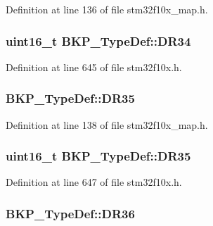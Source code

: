 Definition at line 136 of file stm32f10x\+\_\+map.\+h.

\subsubsection[{\texorpdfstring{D\+R34}{DR34}}]{ {\bf uint16\+\_\+t} B\+K\+P\+\_\+\+Type\+Def\+::\+D\+R34}\hypertarget{struct_b_k_p___type_def_a0e6152e3a9ac3f0086df42cebb80832f}{}\label{struct_b_k_p___type_def_a0e6152e3a9ac3f0086df42cebb80832f}


Definition at line 645 of file stm32f10x.\+h.

\subsubsection[{\texorpdfstring{D\+R35}{DR35}}]{ B\+K\+P\+\_\+\+Type\+Def\+::\+D\+R35}\hypertarget{struct_b_k_p___type_def_abc1d1c0efc3a7fe0cd02d18baa522668}{}\label{struct_b_k_p___type_def_abc1d1c0efc3a7fe0cd02d18baa522668}


Definition at line 138 of file stm32f10x\+\_\+map.\+h.

\subsubsection[{\texorpdfstring{D\+R35}{DR35}}]{ {\bf uint16\+\_\+t} B\+K\+P\+\_\+\+Type\+Def\+::\+D\+R35}\hypertarget{struct_b_k_p___type_def_a085a88cda3752b0f2248f40c3b552905}{}\label{struct_b_k_p___type_def_a085a88cda3752b0f2248f40c3b552905}


Definition at line 647 of file stm32f10x.\+h.

\subsubsection[{\texorpdfstring{D\+R36}{DR36}}]{ B\+K\+P\+\_\+\+Type\+Def\+::\+D\+R36}\hypertarget{struct_b_k_p___type_def_a09a77dbfabaa70ad8e59aad1e011241a}{}\label{struct_b_k_p___type_def_a09a77dbfabaa70ad8e59aad1e011241a}


